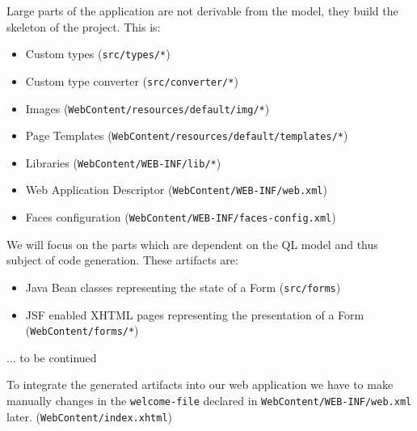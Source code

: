 Large parts of the application are not derivable from the model, they build the skeleton of the project. This is:
\begin{itemize}
\item Custom types (\texttt{src/types/*})
\item Custom type converter (\texttt{src/converter/*})
\item Images (\texttt{WebContent/resources/default/img/*})
\item Page Templates (\texttt{WebContent/resources/default/templates/*})
\item Libraries (\texttt{WebContent/WEB-INF/lib/*})
\item Web Application Descriptor (\texttt{WebContent/WEB-INF/web.xml})
\item Faces configuration (\texttt{WebContent/WEB-INF/faces-config.xml})
\end{itemize}

We will focus on the parts which are dependent on the QL model and thus subject of code generation. These artifacts are:
\begin{itemize}
\item Java Bean classes representing the state of a Form (\texttt{src/forms})
\item JSF enabled XHTML pages representing the presentation of a Form (\texttt{WebContent/forms/*})
\end{itemize}

... to be continued


To integrate the generated artifacts into our web application we have to
make manually changes in the \texttt{welcome-file} declared in \texttt{WebContent/WEB-INF/web.xml} later.
(\texttt{WebContent/index.xhtml})


